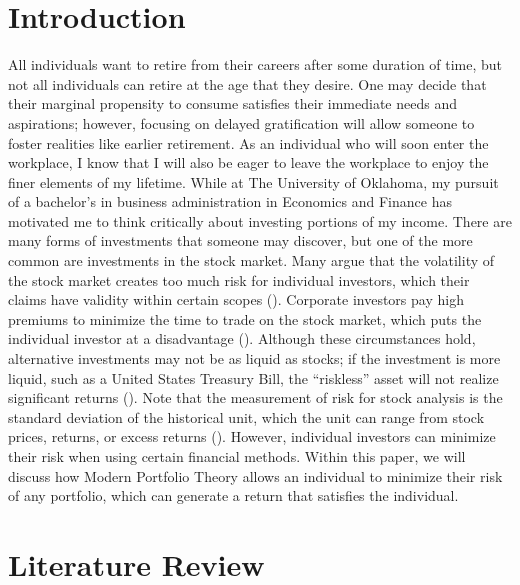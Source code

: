 \documentclass[12pt,english]{article}
\begin{document}
    \begin{doublespace}


    \section{Introduction}\label{sec:intro}\indent{}\indent{} %
    
       All individuals want to retire from their careers after some duration of time, but not all individuals can retire at the age that they desire. One may decide that their marginal propensity to consume satisfies their immediate needs and aspirations; however, focusing on delayed gratification will allow someone to foster realities like earlier retirement. As an individual who will soon enter the workplace, I know that I will also be eager to leave the workplace to enjoy the finer elements of my lifetime. While at The University of Oklahoma, my pursuit of a bachelor’s in business administration in Economics and Finance has motivated me to think critically about investing portions of my income. There are many forms of investments that someone may discover, but one of the more common are investments in the stock market. Many argue that the volatility of the stock market creates too much risk for individual investors, which their claims have validity within certain scopes (\citet{Zucker2020}). Corporate investors pay high premiums to minimize the time to trade on the stock market, which puts the individual investor at a disadvantage (\citet{Patter2020}). Although these circumstances hold, alternative investments may not be as liquid as stocks; if the investment is more liquid, such as a United States Treasury Bill, the “riskless” asset will not realize significant returns (\citet{Canady2020}). Note that the measurement of risk for stock analysis is the standard deviation of the historical unit, which the unit can range from stock prices, returns, or excess returns (\citet{Simon2008}). However, individual investors can minimize their risk when using certain financial methods. Within this paper, we will discuss how Modern Portfolio Theory allows an individual to minimize their risk of any portfolio, which can generate a return that satisfies the individual.  


    \section{Literature Review}\label{sec:litreview}\indent{}\indent{} %
    

\end{doublespace}
\end{document}
